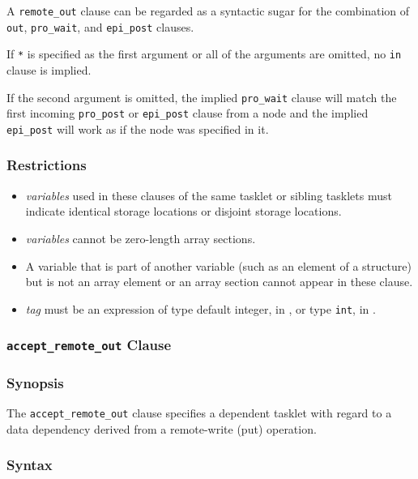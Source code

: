 A \verb|remote_out| clause can be regarded as a syntactic sugar for the
combination of {\tt out}, {\tt pro\_wait}, and {\tt epi\_post} clauses.

If \verb|*| is specified as the first argument or all of the arguments
are omitted, no {\tt in} clause is implied.

If the second argument is omitted, the implied \verb|pro_wait| clause
will match the first incoming \verb|pro_post| or \verb|epi_post| clause
from a node and the implied \verb|epi_post| will work as if the node
was specified in it.

\subsubsection*{Restrictions}

\begin{itemize}
  \item {\it variables} used in these clauses of the same tasklet or sibling
		tasklets must indicate identical storage locations or disjoint
		storage locations.
  \item {\it variables} cannot be zero-length array sections.
  \item A variable that is part of another variable (such as an element
		of a structure) but is not an array element or an array section
		cannot appear in these clause.
  \item {\it tag} must be an expression of type default integer, in
   		{\XMPF}, or type {\tt int}, in {\XMPC}.
\end{itemize}


%
%

\subsubsection{{\tt accept\_remote\_out} Clause}

\subsubsection*{Synopsis}

The \verb|accept_remote_out| clause specifies a dependent tasklet with regard
to a data dependency derived from a remote-write (put) operation.

\subsubsection*{Syntax}

